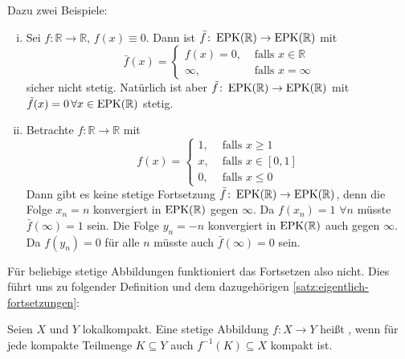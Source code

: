 Dazu zwei Beispiele:
\begin{enumerate}[(i)]
	\item Sei $f \colon \mathbb{R} \to \mathbb{R}$, $f(x) \equiv 0$. Dann ist $\bar{f} \colon \operatorname{EPK}(\mathbb{R}) \to \operatorname{EPK}(\mathbb{R}) $ mit 
	\[
		\bar{f} (x) = \begin{cases}
			f(x)=0, &\text{ falls }x \in \mathbb{R}\\
			\infty , &\text{ falls } x =\infty
		\end{cases}
	\]
	sicher nicht stetig. 
	Natürlich ist aber $\tilde f \colon \operatorname{EPK}(\mathbb{R}) \to \operatorname{EPK}(\mathbb{R})$ mit $\tilde f(x) = 0 \,\forall x \in \operatorname{EPK}(\mathbb{R})$ stetig.
	\item Betrachte $f \colon \mathbb{R} \to \mathbb{R}$ mit 
	\[
		f(x) = \begin{cases}
			1, &\text{ falls }x \ge 1\\
			x, &\text{ falls }x \in [0,1] \\
			0, &\text{ falls }x \le 0
		\end{cases}
	\]
	Dann gibt es keine stetige Fortsetzung $\bar{f} \colon \operatorname{EPK}(\mathbb{R}) \to\operatorname{EPK}(\mathbb{R})$, denn die Folge $x_n = n$ konvergiert in $\operatorname{EPK}(\mathbb{R})$ gegen $\infty$.
	Da $f(x_n) = 1$ $\forall n$ müsste $\bar{f} (\infty) = 1 $ sein. 
	Die Folge $y_n = -n$ konvergiert in $\operatorname{EPK}(\mathbb{R})$ auch gegen $\infty$. 
	Da $f(y_n) = 0$ für alle $n$ müsste auch $\bar{f} (\infty) = 0 $ sein. \light
\end{enumerate}
Für beliebige stetige Abbildungen funktioniert das Fortsetzen also nicht.
Dies führt uns zu folgender Definition und dem dazugehörigen \cref{satz:eigentlich-fortsetzungen}:

\begin{definition}[{name=[eigentliche Abbildung]}]
	Seien $X$ und $Y$ lokalkompakt. 
	Eine stetige Abbildung $f \colon X \to Y$ heißt , wenn für jede kompakte Teilmenge $K \subseteq Y$ auch $f^{-1}(K) \subseteq X$ kompakt ist.
\end{definition}

